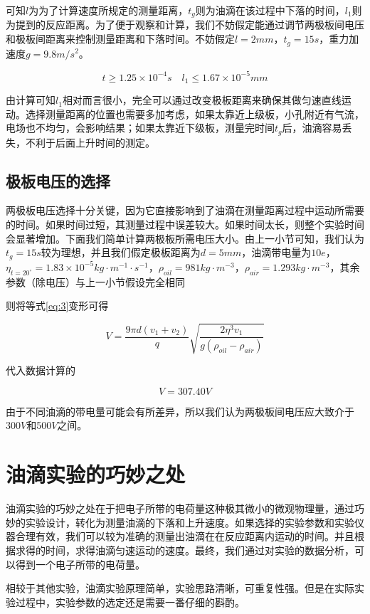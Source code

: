 \documentclass[paper=a4, fontsize=11pt]{scrartcl} %
\numberwithin{equation}{section} %
\numberwithin{figure}{section} %
\numberwithin{table}{section} %
\begin{document}
可知$l$为为了计算速度所规定的测量距离，$t_g$则为油滴在该过程中下落的时间，$l_1$则为提到的反应距离。为了便于观察和计算，我们不妨假定能通过调节两极板间电压和极板间距离来控制测量距离和下落时间。不妨假定$l=2mm$，$t_g=15s$，重力加速度$g=9.8m/s^2$。

\begin{displaymath}
	t \geq 1.25\times 10^{-4}s
	\quad
	l_1\leq 1.67\times 10^{-5} mm
\end{displaymath}

由计算可知$l_1$相对而言很小，完全可以通过改变极板距离来确保其做匀速直线运动。选择测量距离的位置也需要多加考虑，如果太靠近上级板，小孔附近有气流，电场也不均匀，会影响结果；如果太靠近下级板，测量完时间$t_g$后，油滴容易丢失，不利于后面上升时间的测定。

\subsection{\kaishu 极板电压的选择}

两极板电压选择十分关键，因为它直接影响到了油滴在测量距离过程中运动所需要的时间。如果时间过短，其测量过程中误差较大。如果时间太长，则整个实验时间会显著增加。下面我们简单计算两极板所需电压大小。由上一小节可知，我们认为$t_g=15s$较为理想，并且我们假定极板距离为$d=5mm$，油滴带电量为$10e$，$\eta_{t=20^\circ}=1.83\times 10^{-5}kg\cdot m^{-1} \cdot s^{-1}$，$\rho_{oil}=981kg\cdot m^{-3} $，$\rho_{air}=1.293kg\cdot m^{-3}$，其余参数（除电压）与上一小节假设完全相同

则将等式\eqref{eq:3}变形可得

\begin{displaymath}
		V=\dfrac{9\pi d(v_1+v_2)}{q}\sqrt{\dfrac{2\eta^3 v_1}{g(\rho_{oil}-\rho_{air})}}
\end{displaymath}

代入数据计算的

\begin{displaymath}
	V=307.40V
\end{displaymath}

由于不同油滴的带电量可能会有所差异，所以我们认为两极板间电压应大致介于300$V$和500$V$之间。






\section{\kaishu 油滴实验的巧妙之处}
油滴实验的巧妙之处在于把电子所带的电荷量这种极其微小的微观物理量，通过巧妙的实验设计，转化为测量油滴的下落和上升速度。如果选择的实验参数和实验仪器合理有效，我们可以较为准确的测量出油滴在在反应距离内运动的时间。并且根据求得的时间，求得油滴匀速运动的速度。最终，我们通过对实验的数据分析，可以得到一个电子所带的电荷量。

相较于其他实验，油滴实验原理简单，实验思路清晰，可重复性强。但是在实际实验过程中，实验参数的选定还是需要一番仔细的斟酌。
\end{document}
